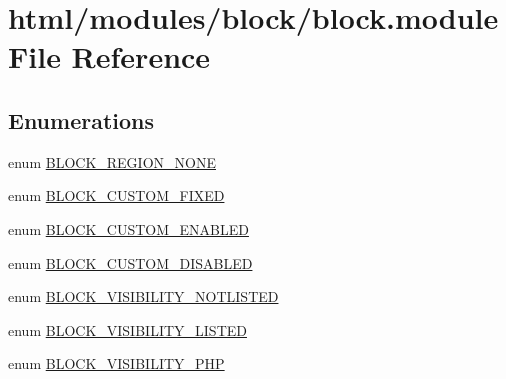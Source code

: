 \hypertarget{block_8module}{
\section{html/modules/block/block.module File Reference}
\label{block_8module}
}
\subsection*{Enumerations}
\begin{DoxyCompactItemize}
\item 
enum \hyperlink{block_8module_a105ef421c8af1d72830a5a26f8a67169}{BLOCK\_\-REGION\_\-NONE} 
\item 
enum \hyperlink{block_8module_ae3e885cda347f368346eeb3ccdf52686}{BLOCK\_\-CUSTOM\_\-FIXED} 
\item 
enum \hyperlink{block_8module_aaa995d4783ea11bc5a11649da4a07e63}{BLOCK\_\-CUSTOM\_\-ENABLED} 
\item 
enum \hyperlink{block_8module_af07b678064998722cf22bdc158bac3cb}{BLOCK\_\-CUSTOM\_\-DISABLED} 
\item 
enum \hyperlink{block_8module_a6db179c4e434f3cd58b9b4358a580e7b}{BLOCK\_\-VISIBILITY\_\-NOTLISTED} 
\item 
enum \hyperlink{block_8module_a0e85f795f4b09b01f2c1226806367f4e}{BLOCK\_\-VISIBILITY\_\-LISTED} 
\item 
enum \hyperlink{block_8module_a9996a6989c8008bdd8bcc5c0d72ccca5}{BLOCK\_\-VISIBILITY\_\-PHP} 
\end{DoxyCompactItemize}
